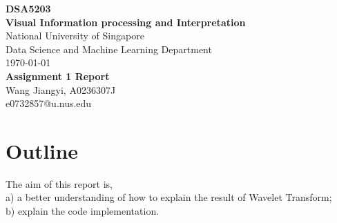 \documentclass{article}
\begin{document}
\begin{titlepage}
	\begin{center}
		\vspace*{1cm}
		\Large{\textbf{DSA5203}}\\
		\Large{\textbf{Visual Information processing and Interpretation}}\\
		\vspace{1cm}
		\small
		National University of Singapore\\
		Data Science and Machine Learning Department\\
		\today \\
		\vfill
		\LARGE{\textbf{Assignment 1 Report}}\\[5mm]
		\vfill
		\small
		Wang Jiangyi, A0236307J\\
		e0732857@u.nus.edu
	\end{center}
\end{titlepage}
\section{Outline}
The aim of this report is,
\vspace{4pt}
\\
a) a better understanding of how to explain the result of Wavelet Transform;
\\
b) explain the code implementation.
\end{document}

